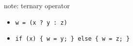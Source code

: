 \begin{frame}[fragile,label=ternaryOp]{note: ternary operator}
    \begin{itemize}
    \item \lstinline|w = (x ? y : z)|
    \item \lstinline|if (x) { w = y; } else { w = z; }|
    \end{itemize}
\end{frame}
